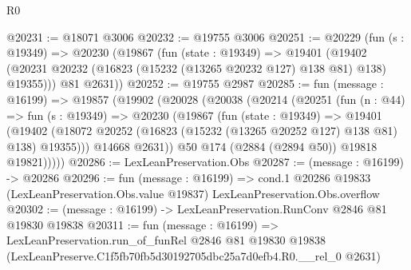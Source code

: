 \begin{lexlean}{R0}
\begin{coremodule}
@20231 := @18071 @3006
@20232 := @19755 @3006
@20251 := @20229
    (fun (s : @19349) =>
    @20230
      (@19867
        (fun (state : @19349) =>
        @19401 (@19402 (@20231 @20232 (@16823 (@15232 (@13265 @20232 @127) @138 @81) @138) @19355)))
        @81
        @2631))
@20252 := @19755 @2987
@20285 := fun (message : @16199) =>
  @19857
    (@19902
      (@20028
        (@20038
          (@20214
            (@20251
              (fun (n : @44) =>
              fun (s : @19349) =>
              @20230
                (@19867
                  (fun (state : @19349) =>
                  @19401
                    (@19402
                      (@18072 @20252 (@16823 (@15232 (@13265 @20252 @127) @138 @81) @138) @19355)))
                  @14668
                  @2631))
              @50
              @174
              (@2884 (@2894 @50))
              @19818
              @19821)))))
@20286 := LexLeanPreservation.Obs
@20287 := (message : @16199) -> @20286
@20296 := fun (message : @16199) =>
  cond.{1} @20286 @19833 (LexLeanPreservation.Obs.value @19837) LexLeanPreservation.Obs.overflow
@20302 := (message : @16199) -> LexLeanPreservation.RunConv @2846 @81 @19830 @19838
@20311 := fun (message : @16199) =>
  LexLeanPreservation.run_of_funRel
    @2846
    @81
    @19830
    @19838
    (LexLeanPreserve.C1f5fb70fb5d30192705dbc25a7d0efb4.R0.__rel_0 @2631)
\end{coremodule}
\end{lexlean}

